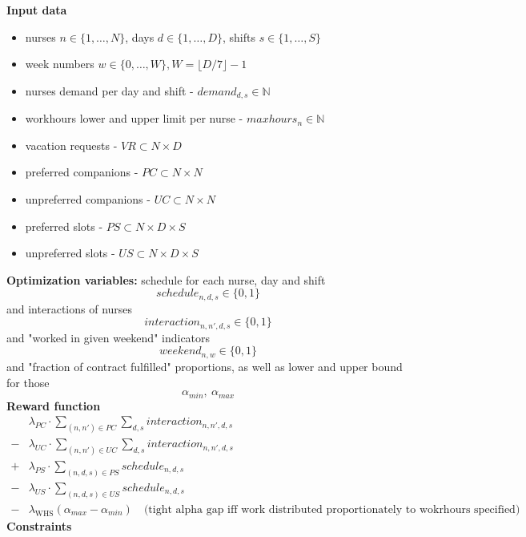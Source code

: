 \documentclass{article}
\newcommand{\N}{\mathbb{N}}
\begin{document}
\noindent \textbf{Input data}
\begin{itemize}
    \item nurses $n\in \{1, \dots, N\}$, days $d\in \{1, \dots, D\}$, shifts $s\in \{1, \dots, S\}$
    \item week numbers $w\in\{0, \dots, W\}, W=\lfloor D/7 \rfloor - 1$
    \item nurses demand per day and shift - $demand_{d,s} \in \N$
    \item workhours lower and upper limit per nurse - $maxhours_n \in \N$
    \item vacation requests - $VR \subset N \times D$
    \item preferred companions - $PC \subset N \times N$
    \item unpreferred companions - $UC \subset N \times N$
    \item preferred slots - $PS \subset N \times D \times S$
    \item unpreferred slots - $US \subset N \times D \times S$
\end{itemize}
\textbf{Optimization variables:} schedule for each nurse, day and shift 
$$schedule_{n,d,s} \in \{0,1\}$$
and interactions of nurses \quad {}
$$interaction_{n,n',d,s} \in \{0,1\}$$
and "worked in given weekend" indicators
$$weekend_{n, w} \in \{0, 1\}$$
and "fraction of contract fulfilled" proportions, as well as lower and upper bound for those
$$\alpha_{min},\ \alpha_{max}$$
\textbf{Reward function}
\begin{align*}
     &\lambda_{PC}\cdot\sum_{(n, n')\in PC}\sum_{d,s} interaction_{n,n',d,s} \\
    -&\lambda_{UC}\cdot\sum_{(n, n')\in UC}\sum_{d,s} interaction_{n,n',d,s} \\ 
    +&\lambda_{PS}\cdot\sum_{(n, d, s)\in PS} schedule_{n,d,s} \\ 
    -&\lambda_{US}\cdot\sum_{(n, d, s)\in US} schedule_{n,d,s} \\
    -&\lambda_\text{WHS} (\alpha_{max} - \alpha_{min})\quad \text{(tight alpha gap iff work distributed proportionately to wokrhours specified)}
\end{align*}
\textbf{Constraints}
\end{document}

